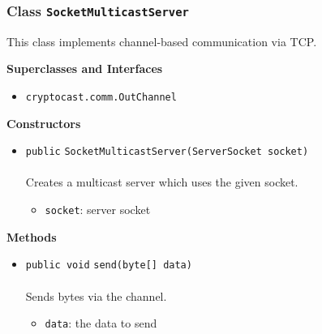 \subsubsection{Class \lstinline|SocketMulticastServer|}
This class implements channel-based communication via TCP. \\
\noindent\begin{minipage}[t]{5cm}
\vspace{0.3em}
\hspace*{2em}
\vspace{0.3em}
\end{minipage}



\textbf{\sffamily Superclasses and Interfaces}
\begin{itemize}
\item \lstinline|cryptocast.comm.OutChannel|
\end{itemize}


\textbf{\sffamily Constructors}
\begin{itemize}
\item \lstinline|public| \lstinline|SocketMulticastServer|\lstinline|(ServerSocket socket)|\\ \\[-0.6em]
Creates a multicast server which uses the given socket.
\begin{itemize}
\item \lstinline|socket|: server socket
\end{itemize}



\end{itemize}


\textbf{\sffamily Methods}
\begin{itemize}
\item \lstinline|public void| \lstinline|send|\lstinline|(byte[] data)|\\ \\[-0.6em]
Sends bytes via the channel.
\begin{itemize}
\item \lstinline|data|: the data to send
\end{itemize}



\end{itemize}

